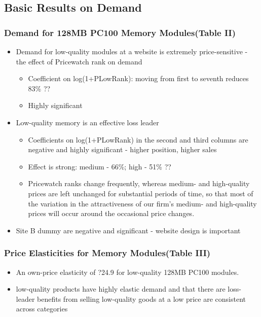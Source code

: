 \documentclass{beamer}
\begin{document}
\subsection{Basic Results on Demand}
\begin{frame}[allowframebreaks]
\frametitle{Demand for 128MB PC100 Memory Modules(Table II)}
\begin{itemize}
\item Demand for low-quality modules at a website is extremely price-sensitive - the effect of Pricewatch rank on demand
    \begin{itemize}
    \item Coefficient on log(1+PLowRank): moving from first to seventh reduces 83\% ??
    \item Highly significant
    \end{itemize}
    
\framebreak
 
\item Low-quality memory is an effective loss leader
\begin{itemize}
\item Coefficients on log(1+PLowRank) in the second and third columns are negative and highly significant - higher position, higher sales
\item Effect is strong: medium - 66\%; high - 51\%  ??
\item Pricewatch ranks change frequently, whereas medium- and high-quality prices are left unchanged for substantial periods of time, so that most of the
variation in the attractiveness of our firm's medium- and high-quality prices will occur around the occasional price changes.
\end{itemize}
\item Site B dummy are negative and significant - website design is important
\end{itemize}
\end{frame}

\begin{frame}
\frametitle{Price Elasticities for Memory Modules(Table III)}
\begin{itemize}
\item An own-price elasticity of ?24.9 for low-quality 128MB PC100 modules.
\item  low-quality products have highly elastic demand and that there are loss-leader benefits from selling low-quality goods at a low price are consistent across categories
\end{itemize}
\end{frame}
\end{document}
